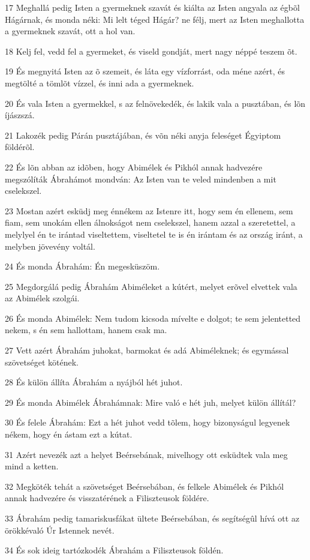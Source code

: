 \par 17 Meghallá pedig Isten a gyermeknek szavát és kiálta az Isten angyala az égbõl Hágárnak, és monda néki: Mi lelt téged Hágár? ne félj, mert az Isten meghallotta a gyermeknek szavát, ott a hol van.
\par 18 Kelj fel, vedd fel a gyermeket, és viseld gondját, mert nagy néppé teszem õt.
\par 19 És megnyitá Isten az õ szemeit, és láta egy vízforrást, oda méne azért, és megtölté a tömlõt vízzel, és inni ada a gyermeknek.
\par 20 És vala Isten a gyermekkel, s az felnövekedék, és lakik vala a pusztában, és lõn íjászszá.
\par 21 Lakozék pedig Párán pusztájában, és võn néki anyja feleséget Égyiptom földérõl.
\par 22 És lõn abban az idõben, hogy Abimélek és Pikhól annak hadvezére megszólíták Ábrahámot mondván: Az Isten van te veled mindenben a mit cselekszel.
\par 23 Mostan azért esküdj meg énnékem az Istenre itt, hogy sem én ellenem, sem fiam, sem unokám ellen álnokságot nem cselekszel, hanem azzal a szeretettel, a melylyel én te irántad viseltettem, viseltetel te is én irántam és az ország iránt, a melyben jövevény voltál.
\par 24 És monda Ábrahám: Én megesküszöm.
\par 25 Megdorgálá pedig Ábrahám Abiméleket a kútért, melyet erõvel elvettek vala az Abimélek szolgái.
\par 26 És monda Abimélek: Nem tudom kicsoda mívelte e dolgot; te sem jelentetted nekem, s én sem hallottam, hanem csak ma.
\par 27 Vett azért Ábrahám juhokat, barmokat és adá Abiméleknek; és egymással szövetséget kötének.
\par 28 És külön állíta Ábrahám a nyájból hét juhot.
\par 29 És monda Abimélek Ábrahámnak: Mire való e hét juh, melyet külön állítál?
\par 30 És felele Ábrahám: Ezt a hét juhot vedd tõlem, hogy bizonyságul legyenek nékem, hogy én ástam ezt a kútat.
\par 31 Azért nevezék azt a helyet Beérsebának, mivelhogy ott esküdtek vala meg mind a ketten.
\par 32 Megköték tehát a szövetséget Beérsebában, és felkele Abimélek és Pikhól annak hadvezére és visszatérének a Filiszteusok földére.
\par 33 Ábrahám pedig tamariskusfákat ültete Beérsebában, és segítségûl hívá ott az örökkévaló Úr Istennek nevét.
\par 34 És sok ideig tartózkodék Ábrahám a Filiszteusok földén.

